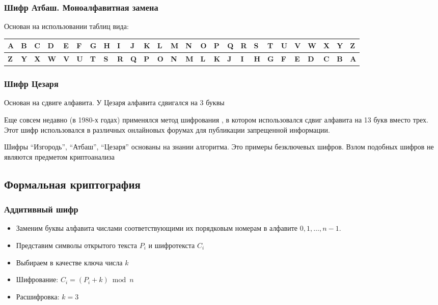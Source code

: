\documentclass[a4paper, 14pt]{extarticle}
\begin{document}
\subsubsection{Шифр Атбаш. Моноалфавитная замена}
Основан на использовании таблиц вида:

\begin{tabular}{|l|l|l|l|l|l|l|l|l|l|l|l|l|l|l|l|l|l|l|l|l|l|l|l|l|l|} %
\hline %
\textbf{A} & \textbf{B} & \textbf{C} & \textbf{D} & \textbf{E} & \textbf{F} & \textbf{G} & \textbf{H} & \textbf{I} & \textbf{J} & \textbf{K} & \textbf{L} & \textbf{M} & \textbf{N} & \textbf{O} & \textbf{P} & \textbf{Q} & \textbf{R} & \textbf{S} & \textbf{T} & \textbf{U} & \textbf{V} & \textbf{W} & \textbf{X} & \textbf{Y} & \textbf{Z} \\ \hline %
\textbf{Z} & \textbf{Y} & \textbf{X} & \textbf{W} & \textbf{V} & \textbf{U} & \textbf{T} & \textbf{S} & \textbf{R} & \textbf{Q} & \textbf{P} & \textbf{O} & \textbf{N} & \textbf{M} & \textbf{L} & \textbf{K} & \textbf{J} & \textbf{I} & \textbf{H} & \textbf{G} & \textbf{F} & \textbf{E} & \textbf{D} & \textbf{C} & \textbf{B} & \textbf{A} \\ \hline %
\end{tabular}

\subsubsection{Шифр Цезаря}
Основан на сдвиге алфавита. У Цезаря алфавита сдвигался на 3 буквы

Еще совсем недавно (в 1980-х годах) применялся метод шифрования , в котором использовался сдвиг алфавита на 13 букв вместо трех. Этот шифр использовался в различных онлайновых форумах для публикации запрещенной информации.

Шифры ``Изгородь'', ``Атбаш'', ``Цезаря'' основаны на знании алгоритма. Это примеры безключевых шифров. Взлом подобных шифров не являются предметом криптоанализа

\subsection{Формальная криптография}
\subsubsection{Аддитивный шифр}
\begin{itemize}
    \item Заменим буквы алфавита числами соответствующими их порядковым номерам в алфавите $0, 1, \ldots, n-1$.
    \item Представим символы открытого текста $P_i$ и шифротекста $C_i$
    \item Выбираем в качестве ключа числа $k$
    \item Шифрование: $C_i = (P_i + k) \bmod n$ 
    \item Расшифровка: $k=3$
\end{itemize}
\end{document}
